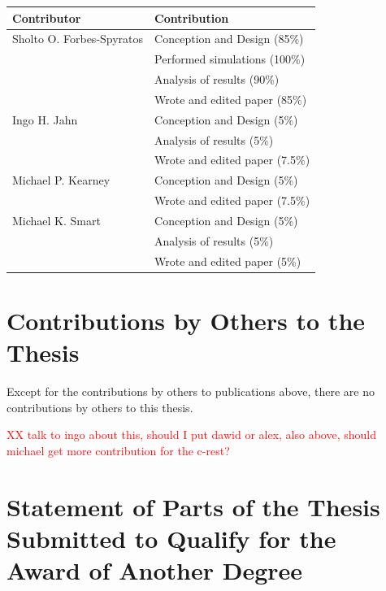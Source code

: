 \begin{center}
  \begin{tabular}{ll}
    \toprule
    Contributor   & Contribution \\
    \midrule
    Sholto O. Forbes-Spyratos             
                                  & Conception and Design (85\%)\\
                                  & Performed simulations (100\%)\\
                                  & Analysis of results (90\%)\\
                                  & Wrote and edited paper (85\%)\\
    \midrule
    Ingo H. Jahn            
                                  & Conception and Design (5\%)\\
                                  & Analysis of results (5\%)\\
                                  & Wrote and edited paper (7.5\%)\\
                                  
        \midrule
        Michael P. Kearney            
								      & Conception and Design (5\%)\\
								      & Wrote and edited paper (7.5\%)\\                       

    \midrule
    Michael K. Smart              
                                  & Conception and Design (5\%)\\
                                  & Analysis of results (5\%)\\
                                  & Wrote and edited paper (5\%)\\
    \bottomrule
  \end{tabular}
\end{center}



\section*{Contributions by Others to the Thesis}

Except for the contributions by others to publications above, there are no contributions by others to this thesis.

\textcolor{red}{XX talk to ingo about this, should I put dawid or alex, also above, should michael get more contribution for the c-rest?}
\section*{Statement of Parts of the Thesis Submitted to Qualify for the Award of Another Degree}

